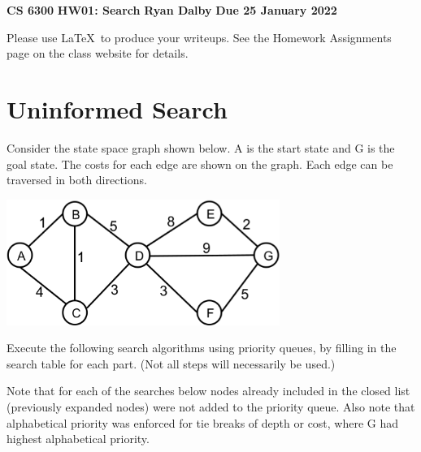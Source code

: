 \documentclass[11pt]{article}
\begin{document}
\thispagestyle{empty}

\begin{center}
{\bf CS 6300} \hfill {\large\bf HW01:  Search} \hfill {\bf Ryan Dalby} \hfill {\bf Due 25 January 2022}
\end{center}

Please use \LaTeX\ to produce your writeups. See the Homework Assignments 
page on the class website for details.

\section{Uninformed Search}

Consider the state space graph shown below.  A is the start state and
G is the goal state. The costs for each edge are shown on the graph.
Each edge can be traversed in both directions.

\begin{center}
\includegraphics[width=3.5in]{search_graph.eps}
\end{center}

Execute the following search algorithms using priority queues, by
filling in the search table for each part.  (Not all steps will
necessarily be used.)

\vspace{.25in}
Note that for each of the searches below nodes already included in the closed list (previously expanded nodes) were not added to the priority queue.
Also note that alphabetical priority was enforced for tie breaks of depth or cost, where G had highest alphabetical priority.
\end{document}
